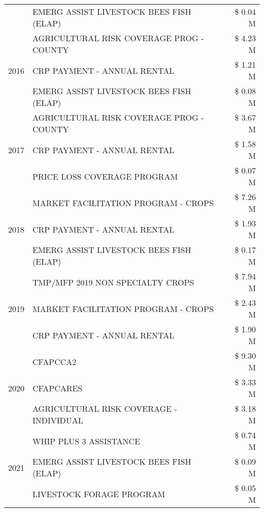 \begin{tabular}{llr}
 & EMERG ASSIST LIVESTOCK BEES FISH (ELAP) & \$ 0.04 M \\
\cline{1-3}
\multirow[t]{3}{*}{2016} & AGRICULTURAL RISK COVERAGE PROG - COUNTY & \$ 4.23 M \\
 & CRP PAYMENT - ANNUAL RENTAL & \$ 1.21 M \\
 & EMERG ASSIST LIVESTOCK BEES FISH (ELAP) & \$ 0.08 M \\
\cline{1-3}
\multirow[t]{3}{*}{2017} & AGRICULTURAL RISK COVERAGE PROG - COUNTY & \$ 3.67 M \\
 & CRP PAYMENT - ANNUAL RENTAL & \$ 1.58 M \\
 & PRICE LOSS COVERAGE PROGRAM & \$ 0.07 M \\
\cline{1-3}
\multirow[t]{3}{*}{2018} & MARKET FACILITATION PROGRAM - CROPS & \$ 7.26 M \\
 & CRP PAYMENT - ANNUAL RENTAL & \$ 1.93 M \\
 & EMERG ASSIST LIVESTOCK BEES FISH (ELAP) & \$ 0.17 M \\
\cline{1-3}
\multirow[t]{3}{*}{2019} & TMP/MFP 2019 NON SPECIALTY CROPS & \$ 7.94 M \\
 & MARKET FACILITATION PROGRAM - CROPS & \$ 2.43 M \\
 & CRP PAYMENT - ANNUAL RENTAL & \$ 1.90 M \\
\cline{1-3}
\multirow[t]{3}{*}{2020} & CFAPCCA2 & \$ 9.30 M \\
 & CFAPCARES & \$ 3.33 M \\
 & AGRICULTURAL RISK COVERAGE - INDIVIDUAL & \$ 3.18 M \\
\cline{1-3}
\multirow[t]{3}{*}{2021} & WHIP PLUS 3 ASSISTANCE & \$ 0.74 M \\
 & EMERG ASSIST LIVESTOCK BEES FISH (ELAP) & \$ 0.09 M \\
 & LIVESTOCK FORAGE PROGRAM & \$ 0.05 M \\
\cline{1-3}
\bottomrule
\end{tabular}

